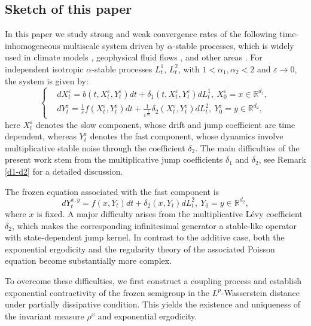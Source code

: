 \documentclass[11pt,reqno]{amsart}
\numberwithin{equation}{section}
\newcommand{\al}{\alpha}
\begin{document}
\subsection{Sketch of this paper}
In this paper we study strong and weak convergence rates of the following time-inhomogeneous multiscale system driven by $\al$-stable processes, which is widely used in  climate models  \cite{YK,MTV}, geophysical
fluid flows \cite{GD}, and other areas \cite{CK,PS}. For independent isotropic  $\alpha$-stable processes  $L^{1}_{t}$, $L^{2}_{t}$, with $1<\alpha_{1},\alpha_{2}<2$ and $\varepsilon \rightarrow 0$, the system is given by:
\begin{equation}\label{1.1}
\left\{
\begin{aligned}
& dX_{t}^{\varepsilon}=b(t,X_{t}^{\varepsilon},Y_{t}^{\varepsilon})dt+\delta_{1}(t,X_{t}^{\varepsilon},Y_{t}^{\varepsilon})dL^{1}_{t},\ X^{\varepsilon}_{0}=x\in \mathbb{R}^{d_{1} },\\
&dY_{t}^{\varepsilon}=\frac{1}{\varepsilon}f(X_{t}^{\varepsilon},Y_{t}^{\varepsilon})dt+\frac{1}{\varepsilon^{\frac{1}{\alpha_{2}}}}\delta_{2}(X_{t}^{\varepsilon},Y_{t}^{\varepsilon})dL^{2}_{t},\ Y^{\varepsilon}_{0}=y\in \mathbb{R}^{d_{2}},
\end{aligned}
\right.
\end{equation}
here $X_{t}^{\varepsilon}$  denotes the slow component, whose drift and jump coefficient are time dependent, whereas $Y_{t}^{\varepsilon}$ denotes the fast component, whose dynamics involve multiplicative stable noise through the coefficient $\delta_2$.
The main difficulties of the present work stem from the multiplicative jump coefficients $\delta_1$ and $\delta_2$, see Remark \ref{d1-d2} for a detailed discussion. 




The frozen equation associated with the fast component is
$$	dY_{t}^{x,y}=f(x,Y_{t})dt+\delta_{2}(x,Y_{t})dL^{2}_{t},\ Y_{0}=y\in \mathbb{R}^{d_{2} },$$
where $x$ is fixed.
A major difficulty arises from the multiplicative L\'evy coefficient $\delta_2$, which makes the corresponding infinitesimal generator a stable-like operator with state-dependent jump kernel. In contrast to the additive case, both the exponential ergodicity and the regularity theory of the associated Poisson equation become substantially more complex.

To overcome these difficulties, we first construct a coupling process and establish exponential contractivity of the frozen semigroup in the $L^p$-Wasserstein distance under partially dissipative condition. This yields the existence and uniqueness of the invariant measure $\rho^x$ and exponential ergodicity.
\end{document}
